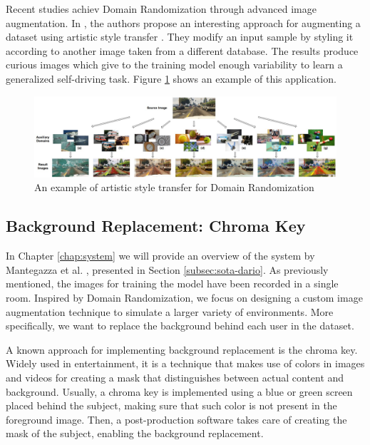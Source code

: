 Recent studies achiev Domain Randomization through advanced image augmentation. In \cite{yue2019domain}, the authors propose an interesting approach for augmenting a dataset using artistic style transfer \cite{gatys2015neural}. They modify an input sample by styling it according to another image taken from a different database. The results produce curious images which give to the training model enough variability to learn a generalized self-driving task. Figure \ref{fig:02-domain-artistic} shows an example of this application.

\begin{figure}[!h]
    \centering
    \includegraphics[width=1\textwidth]{"contents/images/02-domain-artistic"}
    \caption[An example of artistic style transfer for Domain Randomization]{An example of artistic style transfer for Domain Randomization \cite{yue2019domain}}
    \label{fig:02-domain-artistic}
\end{figure}



\subsection{Background Replacement: Chroma Key}
\label{subsec:chromakey}

In Chapter \ref{chap:system} we will provide an overview of the system by Mantegazza et al. \cite{mantegazza2019visionbased}, presented in Section \ref{subsec:sota-dario}. As previously mentioned, the images for training the model have been recorded in a single room. Inspired by Domain Randomization, we focus on designing a custom image augmentation technique to simulate a larger variety of environments. More specifically, we want to replace the background behind each user in the dataset.

A known approach for implementing background replacement is the chroma key. Widely used in entertainment, it is a technique that makes use of colors in images and videos for creating a mask that distinguishes between actual content and background. Usually, a chroma key is implemented using a blue or green screen placed behind the subject, making sure that such color is not present in the foreground image. Then, a post-production software takes care of creating the mask of the subject, enabling the background replacement.

